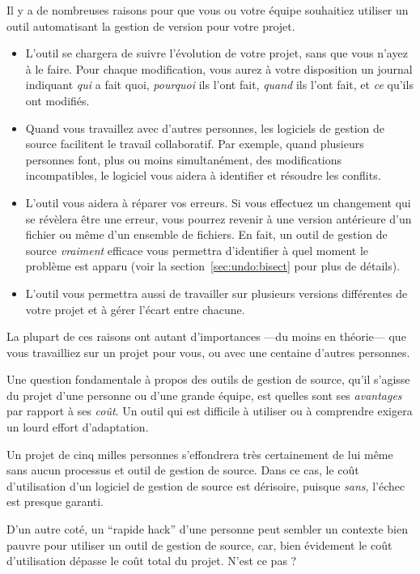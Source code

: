 Il y a de nombreuses raisons pour que vous ou votre équipe souhaitiez
utiliser un outil automatisant la gestion de version pour votre projet.
\begin{itemize}
\item L'outil se chargera de suivre l'évolution de votre projet, sans
que vous n'ayez à le faire. Pour chaque modification, vous aurez à votre
disposition un journal indiquant \emph{qui} a fait quoi, \emph{pourquoi}
ils l'ont fait, \emph{quand} ils l'ont fait, et \emph{ce} qu'ils ont
modifiés.
\item Quand vous travaillez avec d'autres personnes, les logiciels de 
gestion de source facilitent le travail collaboratif. Par exemple, quand
plusieurs personnes font, plus ou moins simultanément, des modifications
incompatibles, le logiciel vous aidera à identifier et résoudre les conflits.
\item L'outil vous aidera à réparer vos erreurs. Si vous effectuez un changement
qui se révèlera être une erreur, vous pourrez revenir à une version
antérieure d'un fichier ou même d'un ensemble de fichiers. En fait, un outil de
gestion de source \emph{vraiment} efficace vous permettra d'identifier à quel
moment le problème est apparu (voir la section~\ref{sec:undo:bisect} pour plus
de détails).
\item L'outil vous permettra aussi de travailler sur plusieurs versions différentes
de votre projet et à gérer l'écart entre chacune.
\end{itemize}
La plupart de ces raisons ont autant d'importances ---du moins en théorie--- que
vous travailliez sur un projet pour vous, ou avec une centaine d'autres
personnes.

Une question fondamentale à propos des outils de gestion de source, qu'il s'agisse
du projet d'une personne ou d'une grande équipe, est quelles sont ses  
\emph{avantages} par rapport à ses \emph{coût}. Un outil qui est difficile à 
utiliser ou à comprendre exigera un lourd effort d'adaptation.

Un projet de cinq milles personnes s'effondrera très certainement de lui même
sans aucun processus et outil de gestion de source. Dans ce cas, le coût 
d'utilisation d'un logiciel de gestion de source est dérisoire, puisque 
\emph{sans}, l'échec est presque garanti.

D'un autre coté, un ``rapide hack'' d'une personne peut sembler un contexte
bien pauvre pour utiliser un outil de gestion de source, car, bien évidement
le coût d'utilisation dépasse le coût total du projet. N'est ce pas ?

